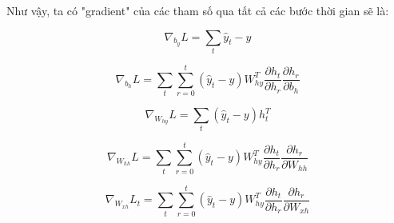 Như vậy, ta có "gradient" của các tham số qua tất cả các bước thời gian sẽ là:


\begin{equation} \label{updateParams2}
	\nabla_{b_{y}}L = \sum_{t} \hat{y}_t - y
\end{equation}

\begin{equation} \label{updateParams3}
	\nabla_{b_h}L = \sum_{t} \sum_{r=0}^{t} (\hat{y}_t - y) W_{hy}^T \frac{\partial h_{t}}{\partial h_r} \frac{\partial h_r}{\partial b_h}
\end{equation}

\begin{equation} \label{updateParams4}
	\nabla_{W_{hy}}L = \sum_{t} (\hat{y}_t - y) h_t^T
\end{equation}

\begin{equation} \label{updateParams5}
	\nabla_{W_{hh}}L = \sum_{t} \sum_{r=0}^{t}  (\hat{y}_t - y) W_{hy}^T \frac{\partial h_{t}}{\partial h_r} \frac{\partial h_r}{\partial W_{hh}}
\end{equation}

\begin{equation} \label{updateParams6}
	\nabla_{W_{xh}}L_t = \sum_{t} \sum_{r=0}^{t} (\hat{y}_t - y) W_{hy}^T \frac{\partial h_{t}}{\partial h_r} \frac{\partial h_r}{\partial W_{xh}}
\end{equation}




